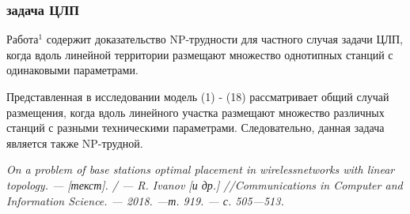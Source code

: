 \begin{frame}
    \frametitle{задача ЦЛП}
    \justifying
    
    Работа$^1$ содержит доказательство NP-трудности для частного случая задачи ЦЛП, когда вдоль линейной территории размещают множество однотипных станций с одинаковыми параметрами. 
    \bigskip
    
    Представленная в исследовании модель (1) - (18) рассматривает общий случай размещения, когда вдоль линейного участка размещают множество различных станций с разными техническими параметрами. Следовательно, данная задача является также NP-трудной.
    \bigskip

    
    \bigskip

    \bigskip
    \bigskip
    \begin{minipage}[b]{0.99\linewidth}
        \fontsize{6pt}{7.2}\selectfont
    \textit{ On a problem of base stations optimal placement in wirelessnetworks with linear topology. — [текст]. / — R. Ivanov [и др.] //Communications in Computer and Information Science. — 2018. —т. 919. — с. 505—513.}
    \end{minipage}

\end{frame}

